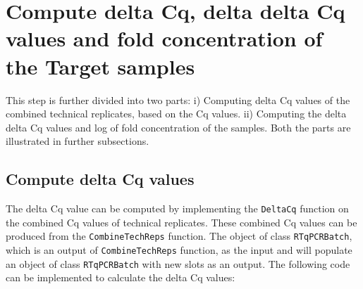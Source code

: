 \documentclass[11pt]{article}
\newcommand{\code}[1]{{\tt #1}}
\begin{document}
\section{Compute delta Cq, delta delta Cq values and fold concentration of the Target samples} 
This step is further divided into two parts: i) Computing delta Cq values of the combined technical
replicates, based on the Cq values. ii) Computing the delta delta Cq values and log of fold concentration
of the samples. Both the parts are illustrated in further subsections.
\subsection{Compute delta Cq values} 
The delta Cq value can be computed by implementing the \code{DeltaCq} function on the combined Cq values of 
technical replicates. These combined Cq values can be produced from the \code{CombineTechReps} function.
The object of class \code{RTqPCRBatch}, which is an output of \code{CombineTechReps} function, as the input
and will populate an object of class \code{RTqPCRBatch} with new slots as an output. The following code can
be implemented to calculate the delta Cq values:
\end{document}
